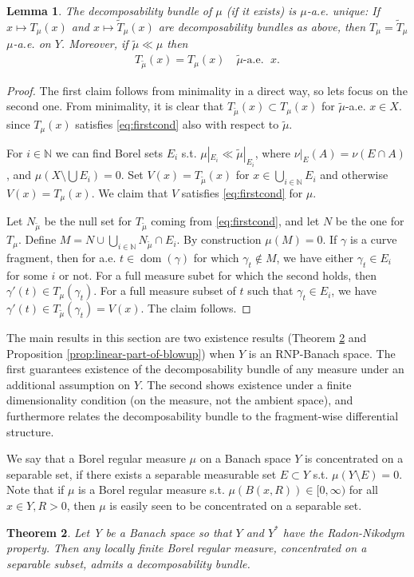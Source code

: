 \documentclass{amsart}
\newtheorem{theorem}{Theorem}[section]
\newtheorem{lemma}[theorem]{Lemma}
\numberwithin{equation}{section}
\newcommand{\N}{\mathbb{N}}
\newcommand{\dom}{\operatorname{dom}}
\begin{document}
\begin{lemma}\label{lem:basic-prop-of-decomp-bundle}
The decomposability bundle of $\mu$ (if it exists) is $\mu$-a.e. unique: If $x\mapsto T_\mu(x)$ and $x\mapsto \widetilde T_\mu(x)$  are decomposability bundles as above, then $T_\mu=\widetilde T_\mu$ $\mu$-a.e. on $Y$. Moreover, if $\tilde\mu\ll\mu$ then 
\begin{align*}
    T_{\tilde\mu}(x)=T_\mu(x)\quad\tilde\mu\mbox{-a.e. }\; x.
\end{align*}
\end{lemma}
\begin{proof}
    The first claim follows from minimality in a direct way, so lets focus on the second one. From minimality, it is clear that $T_{\tilde{\mu}}(x)\subset T_\mu(x)$ for $\tilde{\mu}$-a.e. $x\in X$. since $T_\mu(x)$ satisfies \eqref{eq:firstcond} also with respect to $\tilde{
    \mu}$. 

    For $i\in \N$ we can find Borel sets $E_i$ s.t. $\mu|_{E_i} \ll \tilde{\mu}|_{E_i}$, where $\nu|_E(A)=\nu(E\cap A)$, and $\mu(X\setminus \bigcup E_i)=0$. Set $V(x)=T_{\tilde{\mu}}(x)$ for $x\in \bigcup_{i\in \N}E_i$ and otherwise $V(x)=T_\mu(x)$. We claim that $V$ satisfies \eqref{eq:firstcond} for $\mu$.

    Let $N_{\tilde{\mu}}$ be the null set for $T_{\tilde{\mu}}$ coming from \eqref{eq:firstcond}, and let $N$ be the one for $T_\mu$. Define $M=N\cup \bigcup_{i\in \N} N_{\tilde{\mu}}\cap E_i$. By construction $\mu(M)=0$. If $\gamma$ is a curve fragment, then for a.e. $t\in \dom(\gamma)$ for which $\gamma_t\not\in M$, we have either $\gamma_t\in E_i$ for some $i$ or not. For a full measure subet for which the second holds, then  $\gamma'(t)\in T_\mu(\gamma_t)$. For a full measure subset of $t$ such that $\gamma_t\in E_i$, we have $\gamma'(t)\in T_{\widetilde{\mu}}(\gamma_t)=V(x)$. The claim follows.
\end{proof}
 
The main results in this section are two existence results (Theorem \ref{thm:decomp-bundle} and Proposition \ref{prop:linear-part-of-blowup}) when $Y$ is an RNP-Banach space. The first guarantees existence of the decomposability bundle of any measure under an additional assumption on $Y$. The second shows existence under a finite dimensionality condition (on the measure, not the ambient space), and furthermore relates the decomposability bundle to the fragment-wise differential structure.

We say that a Borel regular measure $\mu$ on a Banach space $Y$ is concentrated on a separable set, if there exists a separable measurable set $E\subset Y$ s.t. $\mu(Y\setminus E)=0$. Note that if $\mu$ is a Borel regular measure s.t. $\mu(B(x,R))\in [0,\infty)$ for all $x\in Y, R>0$, then $\mu$ is easily seen to be concentrated on a separable set.
\begin{theorem}\label{thm:decomp-bundle}
Let Y be a Banach space so that $Y$ and $Y^*$ have the Radon-Nikodym property. Then any locally finite Borel regular measure, concentrated on a separable subset, admits a decomposability bundle.
\end{theorem}
\end{document}

